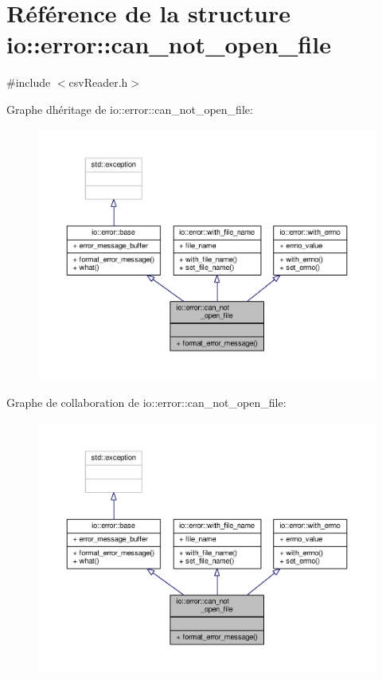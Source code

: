 \hypertarget{structio_1_1error_1_1can__not__open__file}{}\section{Référence de la structure io\+:\+:error\+:\+:can\+\_\+not\+\_\+open\+\_\+file}
\label{structio_1_1error_1_1can__not__open__file}


{\ttfamily \#include $<$csv\+Reader.\+h$>$}



Graphe d\textquotesingle{}héritage de io\+:\+:error\+:\+:can\+\_\+not\+\_\+open\+\_\+file\+:
\nopagebreak
\begin{figure}[H]
\begin{center}
\leavevmode
\includegraphics[width=350pt]{structio_1_1error_1_1can__not__open__file__inherit__graph}
\end{center}
\end{figure}


Graphe de collaboration de io\+:\+:error\+:\+:can\+\_\+not\+\_\+open\+\_\+file\+:
\nopagebreak
\begin{figure}[H]
\begin{center}
\leavevmode
\includegraphics[width=350pt]{structio_1_1error_1_1can__not__open__file__coll__graph}
\end{center}
\end{figure}
